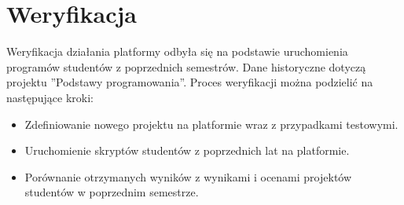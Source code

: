 \section{Weryfikacja}

Weryfikacja działania platformy odbyła się na podstawie uruchomienia programów studentów z poprzednich semestrów.
Dane historyczne dotyczą projektu ”Podstawy programowania”.
Proces weryfikacji można podzielić na następujące kroki:
\begin{itemize}
    \item Zdefiniowanie nowego projektu na platformie wraz z przypadkami testowymi.
    \item Uruchomienie skryptów studentów z poprzednich lat na platformie.
    \item Porównanie otrzymanych wyników z wynikami i ocenami projektów studentów w poprzednim semestrze.
\end{itemize}
